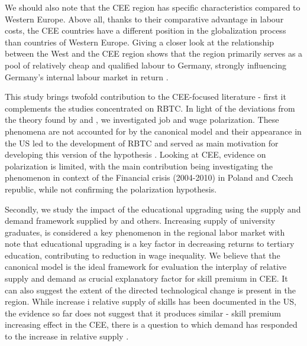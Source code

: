 \documentclass[11pt]{article}
\begin{document}
We should also note that the CEE region has specific characteristics compared to Western Europe. Above all, thanks to their comparative advantage in labour costs, the CEE countries have a different position in the globalization process than countries of Western Europe. Giving a closer look at the relationship between the West and the CEE region shows that the region primarily serves as a pool of relatively cheap and qualified labour to Germany, strongly influencing Germany's internal labour market in return 
\citep{marin2004nation, marin2018global}. 

This study brings twofold contribution to the CEE-focused literature - first it complements the studies concentrated on RBTC. In light of the deviations from the theory found by \citet{arendt2019technical} and \citet{hardy2018educational}, we investigated job and wage polarization. These phenomena are not accounted for by the canonical model and their appearance in the US  led to the development of RBTC and served as main motivation for developing this version of the hypothesis \citep{acemoglu2011skills}. Looking at CEE, evidence on polarization is limited, with the main contribution being \citep{mysikova2018personal} investigating the phenomenon in context of the Financial crisis (2004-2010) in Poland and Czech republic, while not confirming the polarization hypothesis.

Secondly, we study the impact of the educational upgrading using the supply and demand framework supplied by \cite{katz1992changes} and others.  Increasing supply of university graduates, is considered a key phenomenon in the regional labor market \citep{arendt2019technical, hardy2018educational} with \cite{magda2021firms} note that educational upgrading is a key factor in decreasing returns to tertiary education, contributing to reduction in wage inequality. We believe that the canonical model is the ideal framework for evaluation the interplay of relative supply and demand as crucial explanatory factor for skill premium in CEE. It can also suggest the extent of the directed technological change is present in the region. While increase i relative supply of skills has been documented in the US, the evidence so far does not suggest that it produces similar - skill premium increasing effect in the CEE, there is a question to which demand has responded to the increase in relative supply \cite{acemoglu2002directed}. 
\end{document}
